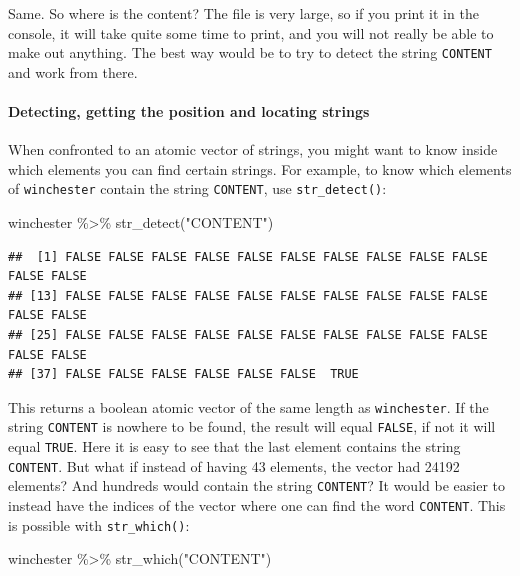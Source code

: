 \documentclass[
]{article}
\newenvironment{Shaded}{\begin{snugshade}}{\end{snugshade}}
\newcommand{\FunctionTok}[1]{\textcolor[rgb]{0.00,0.00,0.00}{#1}}
\newcommand{\NormalTok}[1]{#1}
\newcommand{\SpecialCharTok}[1]{\textcolor[rgb]{0.00,0.00,0.00}{#1}}
\newcommand{\StringTok}[1]{\textcolor[rgb]{0.31,0.60,0.02}{#1}}
\begin{document}
\begin{verbatim}
\end{verbatim}

Same. So where is the content? The file is very large, so if you print it in the console, it will
take quite some time to print, and you will not really be able to make out anything. The best
way would be to try to detect the string \texttt{CONTENT} and work from there.

\hypertarget{detecting-getting-the-position-and-locating-strings}{%
\paragraph{Detecting, getting the position and locating strings}\label{detecting-getting-the-position-and-locating-strings}}

When confronted to an atomic vector of strings, you might want to know inside which elements you
can find certain strings. For example, to know which elements of \texttt{winchester} contain the string
\texttt{CONTENT}, use \texttt{str\_detect()}:

\begin{Shaded}
\begin{Highlighting}[]
\NormalTok{winchester }\SpecialCharTok{\%\textgreater{}\%}
  \FunctionTok{str\_detect}\NormalTok{(}\StringTok{"CONTENT"}\NormalTok{)}
\end{Highlighting}
\end{Shaded}

\begin{verbatim}
##  [1] FALSE FALSE FALSE FALSE FALSE FALSE FALSE FALSE FALSE FALSE FALSE FALSE
## [13] FALSE FALSE FALSE FALSE FALSE FALSE FALSE FALSE FALSE FALSE FALSE FALSE
## [25] FALSE FALSE FALSE FALSE FALSE FALSE FALSE FALSE FALSE FALSE FALSE FALSE
## [37] FALSE FALSE FALSE FALSE FALSE FALSE  TRUE
\end{verbatim}

This returns a boolean atomic vector of the same length as \texttt{winchester}. If the string \texttt{CONTENT} is
nowhere to be found, the result will equal \texttt{FALSE}, if not it will equal \texttt{TRUE}. Here it is easy to
see that the last element contains the string \texttt{CONTENT}. But what if instead of having 43 elements,
the vector had 24192 elements? And hundreds would contain the string \texttt{CONTENT}? It would be easier
to instead have the indices of the vector where one can find the word \texttt{CONTENT}. This is possible
with \texttt{str\_which()}:

\begin{Shaded}
\begin{Highlighting}[]
\NormalTok{winchester }\SpecialCharTok{\%\textgreater{}\%}
  \FunctionTok{str\_which}\NormalTok{(}\StringTok{"CONTENT"}\NormalTok{)}
\end{Highlighting}
\end{Shaded}
\end{document}
